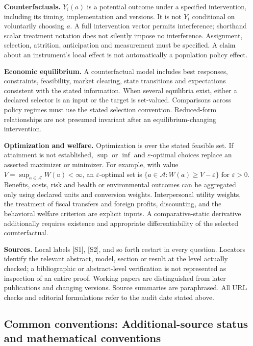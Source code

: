 \documentclass[11pt,a4paper]{article}
\begin{document}
\textbf{Counterfactuals.} $Y_i(a)$ is a potential outcome under a specified intervention, including its timing, implementation and versions. It is not $Y_i$ conditional on voluntarily choosing $a$. A full intervention vector permits interference; shorthand scalar treatment notation does not silently impose no interference. Assignment, selection, attrition, anticipation and measurement must be specified. A claim about an instrument's local effect is not automatically a population policy effect.

\textbf{Economic equilibrium.} A counterfactual model includes best responses, constraints, feasibility, market clearing, state transitions and expectations consistent with the stated information. When several equilibria exist, either a declared selector is an input or the target is set-valued. Comparisons across policy regimes must use the stated selection convention. Reduced-form relationships are not presumed invariant after an equilibrium-changing intervention.

\textbf{Optimization and welfare.} Optimization is over the stated feasible set. If attainment is not established, $\sup$ or $\inf$ and $\varepsilon$-optimal choices replace an asserted maximizer or minimizer. For example, with value $V=\sup_{a\in\mathcal A}W(a)<\infty$, an $\varepsilon$-optimal set is $\{a\in\mathcal A:W(a)\geq V-\varepsilon\}$ for $\varepsilon>0$. Benefits, costs, risk and health or environmental outcomes can be aggregated only using declared units and conversion weights. Interpersonal utility weights, the treatment of fiscal transfers and foreign profits, discounting, and the behavioral welfare criterion are explicit inputs. A comparative-static derivative additionally requires existence and appropriate differentiability of the selected counterfactual.

\textbf{Sources.} Local labels [S1], [S2], and so forth restart in every question. Locators identify the relevant abstract, model, section or result at the level actually checked; a bibliographic or abstract-level verification is not represented as inspection of an entire proof. Working papers are distinguished from later publications and changing versions. Source summaries are paraphrased. All URL checks and editorial formulations refer to the audit date stated above.

\subsection*{Common conventions: Additional-source status and mathematical conventions}
\end{document}
